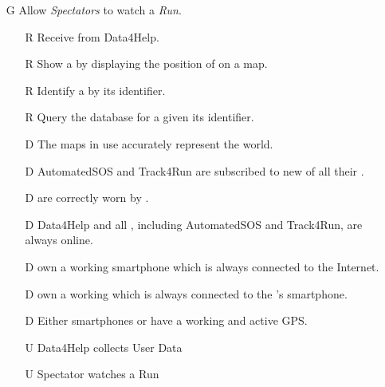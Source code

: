 \documentclass[../../../rasd.tex]{subfiles}
\begin{document}
\begin{itemize}
	\item[G\subs{10}]Allow \textit{Spectators} to watch a \textit{Run}.
	\begin{itemize}
		\item[R\subs{40}]Receive  from Data4Help.
		\item[R\subs{48}]Show a  by displaying the position of  on a map.
		\item[R\subs{49}]Identify a  by its identifier.
		\item[R\subs{50}]Query the database for a  given its identifier.
		\\
		\item[D\subs{3}]The maps in use accurately represent the world.
		\item[D\subs{6}]AutomatedSOS and Track4Run are subscribed to new  of all their .
		\item[D\subs{8}] are correctly worn by .
		\item[D\subs{9}]Data4Help and all , including AutomatedSOS and Track4Run, are always online.
		\item[D\subs{10}] own a working smartphone which is always connected to the Internet.
		\item[D\subs{11}] own a working  which is always connected to the 's smartphone.
		\item[D\subs{12}]Either smartphones or  have a working and active GPS.
		\\
		\item[U\subs{5}]Data4Help collects User Data
		\item[U\subs{16}]Spectator watches a Run
	\end{itemize}
\end{itemize}
\end{document}

